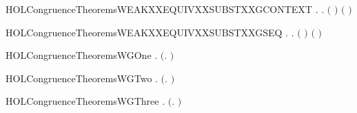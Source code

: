 \begin{SaveVerbatim}{HOLCongruenceTheoremsWEAKXXEQUIVXXSUBSTXXGCONTEXT}
\HOLTokenTurnstile{} \HOLSymConst{\HOLTokenForall{}} .
          \HOLSymConst{\HOLTokenImp{}} \HOLSymConst{\HOLTokenForall{}}.   \HOLSymConst{\HOLTokenImp{}}  \ensuremath{(} \ensuremath{)} \ensuremath{(} \ensuremath{)}
\end{SaveVerbatim}
\newcommand{\HOLCongruenceTheoremsWEAKXXEQUIVXXSUBSTXXGCONTEXT}{\UseVerbatim{HOLCongruenceTheoremsWEAKXXEQUIVXXSUBSTXXGCONTEXT}}
\begin{SaveVerbatim}{HOLCongruenceTheoremsWEAKXXEQUIVXXSUBSTXXGSEQ}
\HOLTokenTurnstile{} \HOLSymConst{\HOLTokenForall{}} .    \HOLSymConst{\HOLTokenImp{}} \HOLSymConst{\HOLTokenForall{}}.   \HOLSymConst{\HOLTokenImp{}}  \ensuremath{(} \ensuremath{)} \ensuremath{(} \ensuremath{)}
\end{SaveVerbatim}
\newcommand{\HOLCongruenceTheoremsWEAKXXEQUIVXXSUBSTXXGSEQ}{\UseVerbatim{HOLCongruenceTheoremsWEAKXXEQUIVXXSUBSTXXGSEQ}}
\begin{SaveVerbatim}{HOLCongruenceTheoremsWGOne}
\HOLTokenTurnstile{} \HOLSymConst{\HOLTokenForall{}}.  \ensuremath{(}\HOLTokenLambda{}. \HOLSymConst{\ensuremath{\ldotp}}\ensuremath{)}
\end{SaveVerbatim}
\newcommand{\HOLCongruenceTheoremsWGOne}{\UseVerbatim{HOLCongruenceTheoremsWGOne}}
\begin{SaveVerbatim}{HOLCongruenceTheoremsWGTwo}
\HOLTokenTurnstile{} \HOLSymConst{\HOLTokenForall{}}.  \ensuremath{(}\HOLTokenLambda{}. \ensuremath{)}
\end{SaveVerbatim}
\newcommand{\HOLCongruenceTheoremsWGTwo}{\UseVerbatim{HOLCongruenceTheoremsWGTwo}}
\begin{SaveVerbatim}{HOLCongruenceTheoremsWGThree}
\HOLTokenTurnstile{} \HOLSymConst{\HOLTokenForall{}} .   \HOLSymConst{\HOLTokenImp{}}  \ensuremath{(}\HOLTokenLambda{}. \HOLSymConst{\ensuremath{\ldotp}} \ensuremath{)}
\end{SaveVerbatim}
